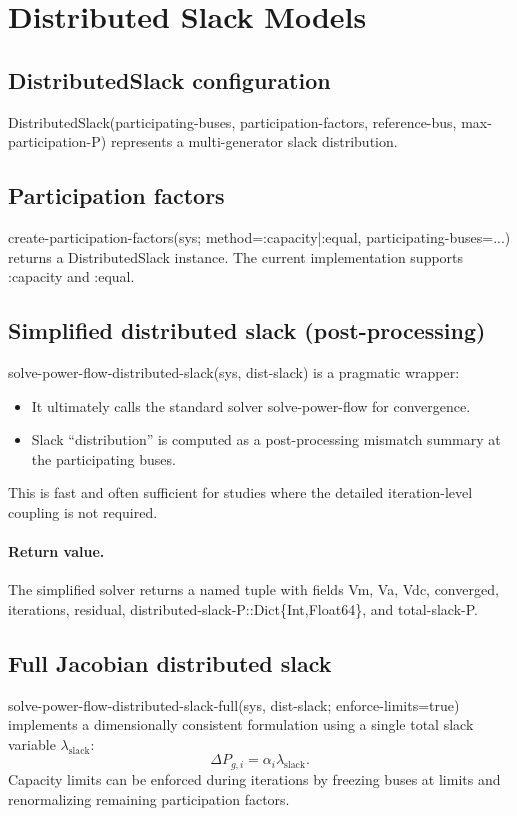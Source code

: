 \documentclass[11pt]{article}
\def\code#1{#1}%
\def\_{-}%
\newcommand{\code}[1]{\nolinkurl{#1}}
\begin{document}
\section{Distributed Slack Models}\label{sec:distributed-slack}

\subsection{\code{DistributedSlack} configuration}
\code{DistributedSlack(participating\_buses, participation\_factors, reference\_bus, max\_participation\_P)} represents a multi-generator slack distribution.

\subsection{Participation factors}
\code{create\_participation\_factors(sys; method=:capacity|:equal, participating\_buses=...)} returns a \code{DistributedSlack} instance. The current implementation supports \code{:capacity} and \code{:equal}.

\subsection{Simplified distributed slack (post-processing)}
\code{solve\_power\_flow\_distributed\_slack(sys, dist\_slack)} is a pragmatic wrapper:
\begin{itemize}[leftmargin=*]
  \item It ultimately calls the standard solver \code{solve\_power\_flow} for convergence.
  \item Slack ``distribution'' is computed as a post-processing mismatch summary at the participating buses.
\end{itemize}
This is fast and often sufficient for studies where the detailed iteration-level coupling is not required.

\paragraph{Return value.}
The simplified solver returns a named tuple with fields
\code{Vm}, \code{Va}, \code{Vdc}, \code{converged}, \code{iterations}, \code{residual},
\code{distributed\_slack\_P::Dict\{Int,Float64\}}, and \code{total\_slack\_P}.

\subsection{Full Jacobian distributed slack}
\code{solve\_power\_flow\_distributed\_slack\_full(sys, dist\_slack; enforce\_limits=true)} implements a dimensionally consistent formulation using a single total slack variable $\lambda_{\text{slack}}$:
\[
\Delta P_{g,i} = \alpha_i \lambda_{\text{slack}}.
\]
Capacity limits can be enforced during iterations by freezing buses at limits and renormalizing remaining participation factors.
\end{document}
